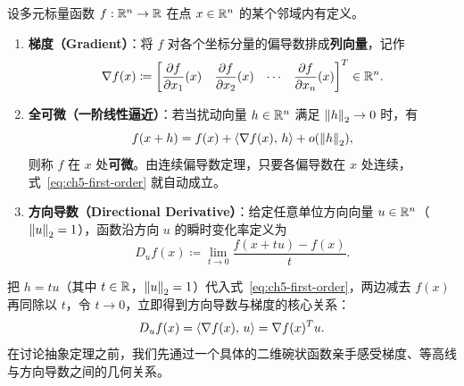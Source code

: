 \begin{defBox}
\begin{definition}\label{def:ch5-grad}
设多元标量函数 $f:\mathbb{R}^n\to\mathbb{R}$ 在点 $x\in\mathbb{R}^n$ 的某个邻域内有定义。
\begin{enumerate}
  \item \textbf{梯度（Gradient）}：将 $f$ 对各个坐标分量的偏导数排成\textbf{列向量}，记作
  \[
    \nabla f(x) \coloneqq
    \begin{bmatrix}
      \dfrac{\partial f}{\partial x_1}(x) &
      \dfrac{\partial f}{\partial x_2}(x) &
      \cdots &
      \dfrac{\partial f}{\partial x_n}(x)
    \end{bmatrix}^T \in \mathbb{R}^n.
  \]
  \item \textbf{全可微（一阶线性逼近）}：若当扰动向量 $h\in\mathbb{R}^n$ 满足 $\left\|h\right\|_2\to 0$ 时，有
  \begin{equation}\label{eq:ch5-first-order}
    f(x + h) = f(x) + \left\langle \nabla f(x),\, h \right\rangle + o(\left\|h\right\|_2),
  \end{equation}
  则称 $f$ 在 $x$ 处\textbf{可微}。由连续偏导数定理，只要各偏导数在 $x$ 处连续，式~\eqref{eq:ch5-first-order} 就自动成立。
  \item \textbf{方向导数（Directional Derivative）}：给定任意单位方向向量 $u\in\mathbb{R}^n$（$\left\|u\right\|_2=1$），函数沿方向 $u$ 的瞬时变化率定义为
  \[
    D_u f(x) \coloneqq \lim_{t\to 0} \frac{f(x + t u) - f(x)}{t}.
  \]
\end{enumerate}
\end{definition}
\end{defBox}

把 $h = t u$（其中 $t\in\mathbb{R}$，$\left\|u\right\|_2=1$）代入式~\eqref{eq:ch5-first-order}，两边减去 $f(x)$ 再同除以 $t$，令 $t\to 0$，立即得到方向导数与梯度的核心关系：
\begin{equation}\label{eq:ch5-dir-deriv}
  D_u f(x) = \left\langle \nabla f(x),\, u \right\rangle = \nabla f(x)^T u.
\end{equation}
在讨论抽象定理之前，我们先通过一个具体的二维碗状函数亲手感受梯度、等高线与方向导数之间的几何关系。

